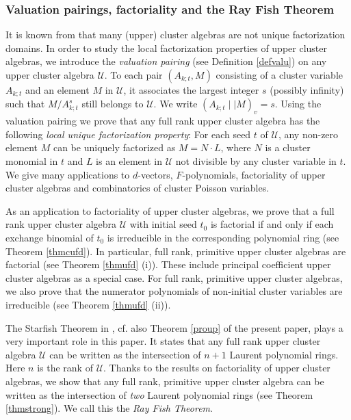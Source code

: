 \documentclass{amsart}
\theoremstyle{definition}
\theoremstyle{remark}
\numberwithin{equation}{section}
\begin{document}
\subsubsection*{Valuation pairings, factoriality and the Ray Fish Theorem}

It is known from \cite{GLS13} that many (upper) cluster algebras are not unique factorization domains.  In order to study the local factorization properties of upper cluster algebras, we introduce the {\em valuation pairing} (see Definition \ref{defvalu}) on any upper cluster algebra $\mathcal U$. To each pair $(A_{k;t},M)$ consisting of a cluster variable $A_{k;t}$ and an element $M$ in $\mathcal U$, it associates the largest integer $s$ (possibly infinity) such that $M/A_{k;t}^s$ still belongs to $\mathcal U$. We write $(A_{k;t}\mid\mid   M)_v=s$. Using the valuation pairing we prove that any full rank upper cluster algebra has the following {\em local unique factorization property}: For each seed $t$ of $\mathcal U$, any non-zero element $M$ can be uniquely factorized as $M=N\cdot L$, where $N$ is a cluster monomial in $t$ and $L$ is an element in $\mathcal U$ not divisible by any cluster variable in $t$.
We give many applications to $d$-vectors, $F$-polynomials, factoriality of upper cluster algebras and combinatorics of cluster Poisson variables.


As an application to factoriality of upper cluster algebras,  we prove that a full rank upper cluster algebra $\mathcal U$ with initial seed $t_0$ is factorial  if and only if each exchange binomial of $t_0$ is irreducible in the corresponding polynomial ring (see Theorem \ref{thmcufd}). In particular, full rank, primitive upper cluster algebras are factorial (see Theorem \ref{thmufd} (i)).  These include principal coefficient upper cluster algebras as a special case. For full rank, primitive upper cluster algebras, we also prove that the numerator polynomials of non-initial cluster variables are irreducible (see Theorem \ref{thmufd} (ii)).

The Starfish Theorem in \cite{BFZ}, cf. also Theorem \ref{proup} of the present paper, plays a very important role in this paper. It states that any full rank upper cluster algebra $\mathcal U$ can be written as the intersection of $n+1$ Laurent polynomial rings. Here $n$ is the rank of $\mathcal U$. Thanks to the results on factoriality of upper cluster algebras, we show that any full rank, primitive upper cluster algebra can be written as the intersection of {\em two} Laurent polynomial rings (see Theorem \ref{thmstrong}). We call this the {\em Ray Fish Theorem}.
\end{document}
